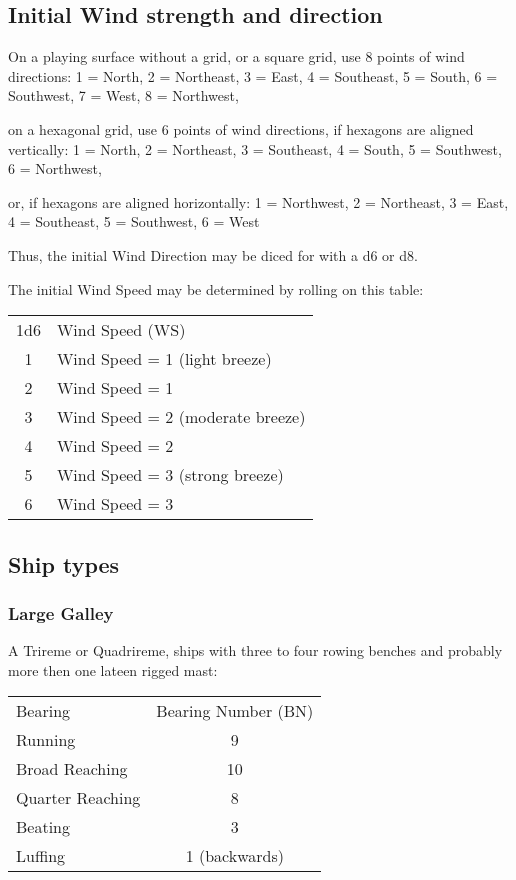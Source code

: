 \documentclass[11pt]{wbzine}
\begin{document}
\begin{multicols}{2}
\subsection{Initial Wind strength and
direction}

On a playing surface without a grid, or a square grid, use 8 points of
wind directions: 1 = North, 2 = Northeast, 3 = East, 4 = Southeast, 5 =
South, 6 = Southwest, 7 = West, 8 = Northwest,

on a hexagonal grid, use 6 points of wind directions, if hexagons are
aligned vertically: 1 = North, 2 = Northeast, 3 = Southeast, 4 = South,
5 = Southwest, 6 = Northwest,

or, if hexagons are aligned horizontally: 1 = Northwest, 2 = Northeast,
3 = East, 4 = Southeast, 5 = Southwest, 6 = West

Thus, the initial Wind Direction may be diced for with a d6 or d8.

The initial Wind Speed may be determined by rolling on this table:

\begin{tabularx}{\columnwidth}{cZ}
1d6 & Wind Speed (WS) \\
1 & Wind Speed = 1 (light breeze) \\
2 & Wind Speed = 1 \\
3 & Wind Speed = 2 (moderate breeze) \\
4 & Wind Speed = 2 \\
5 & Wind Speed = 3 (strong breeze) \\
6 & Wind Speed = 3 \\
\end{tabularx}

\subsection{Ship types}

\subsubsection{Large Galley}

A Trireme or Quadrireme, ships with three to four rowing benches and
probably more then one lateen rigged mast:


\begin{tabularx}{\columnwidth}{Zc}
Bearing & Bearing Number (BN) \\
Running & 9 \\
Broad Reaching & 10 \\
Quarter Reaching & 8 \\
Beating & 3 \\
Luffing & 1 (backwards) \\
\end{tabularx}


\end{multicols}
\end{document}
